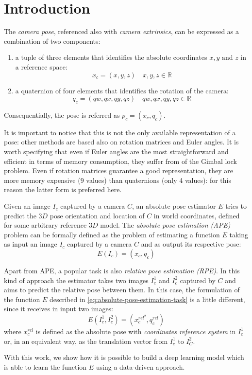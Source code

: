 \section{Introduction}
The \emph{camera pose}, referenced also with \emph{camera extrinsics}, can be expressed as a combination of two components:
\begin{enumerate}
    \item a tuple of three elements that identifies the absolute coordinates $x,y\text{ and }z$ in a reference space:
          \begin{equation}
              x_c=(x,y,z)\quad x,y,z \in \mathbb{R}
              \label{eq:absolute-position-definition}
          \end{equation}
    \item a quaternion of four elements that identifies the rotation of the camera:
          \begin{equation}
              q_c=(qw, qx, qy, qz)\quad qw,qx,qy,qz \in \mathbb{R}
              \label{eq:quaternion-as-rotation-definition}
          \end{equation}

\end{enumerate}
Consequentially, the pose is referred as $p_c=(x_c, q_c)$.

It is important to notice that this is not the only available representation of a pose: other methods are based also on rotation matrices and Euler angles. It is worth specifying that even if Euler angles are the most straightforward and efficient in terms of memory consumption, they suffer from of the Gimbal lock problem. Even if rotation matrices guarantee a good representation, they are more memory expensive (9 values) than quaternions (only 4 values): for this reason the latter form is preferred here.

Given an image $I_c$ captured by a camera $C$, an absolute pose estimator $E$ tries to predict the $3D$ pose orientation and location of $C$ in world coordinates, defined for some arbitrary reference $3D$ model. The \emph{absolute pose estimation (APE)} problem can be formally defined as the problem of estimating a function $E$ taking as input an image $I_c$ captured by a camera $C$ and as output its respective pose:
\begin{equation}
    E(I_c) = (x_c, q_c)
    \label{eq:absolute-pose-estimation-task}
\end{equation}

Apart from APE, a popular task is also \emph{relative pose estimation (RPE)}. In this kind of approach the estimator takes two images $I_c^1$ and $I_c^2$ captured by $C$ and aims to predict the relative pose between them. In this case, the formulation of the function $E$ described in \cref{eq:absolute-pose-estimation-task} is a little different, since it receives in input two images:
\begin{equation}
    E(I_c^1, I_c^2) = (x_c^{rel^2}, q_c^{rel})
    \label{eq:relative-pose-estimation-task}
\end{equation}
where $x_c^{rel}$ is defined as the absolute pose with \emph{coordinates reference system} in $I_c^1$ or, in an equivalent way, as the translation vector from $I_c^1$ to $I_C^2$.

With this work, we show how it is possible to build a deep learning model which is able to learn the function $E$ using a data-driven approach.
